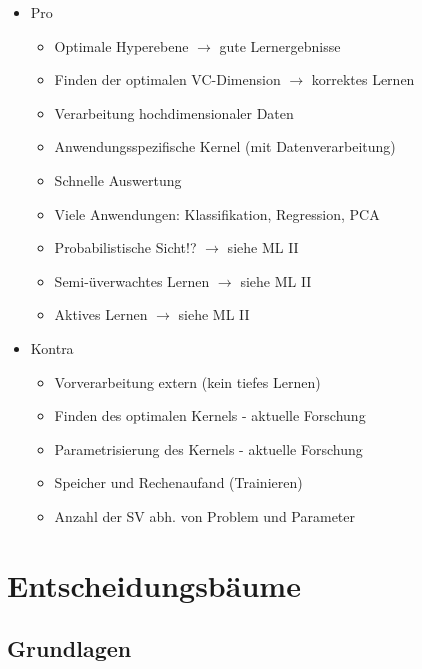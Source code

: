 \documentclass[paper=a4, fontsize=11pt]{scrartcl} %
\numberwithin{equation}{section} %
\numberwithin{figure}{section} %
\numberwithin{table}{section} %
\begin{document}
\begin{itemize}
\item Pro
\begin{itemize}
\item Optimale Hyperebene $\rightarrow$ gute Lernergebnisse
\item Finden der optimalen VC-Dimension $\rightarrow$ korrektes Lernen
\item Verarbeitung hochdimensionaler Daten
\item Anwendungsspezifische Kernel (mit Datenverarbeitung)
\item Schnelle Auswertung
\item Viele Anwendungen: Klassifikation, Regression, PCA
\item Probabilistische Sicht!? $\rightarrow$ siehe ML II
\item Semi-üverwachtes Lernen $\rightarrow$ siehe ML II
\item Aktives Lernen $\rightarrow$ siehe ML II
\end{itemize}
\item Kontra
\begin{itemize}
\item Vorverarbeitung extern (kein tiefes Lernen)
\item Finden des optimalen Kernels - aktuelle Forschung
\item Parametrisierung des Kernels - aktuelle Forschung
\item Speicher und Rechenaufand (Trainieren)
\item Anzahl der SV abh. von Problem und Parameter
\end{itemize}
\end{itemize}

\section{Entscheidungsbäume}

\subsection{Grundlagen}
\end{document}
